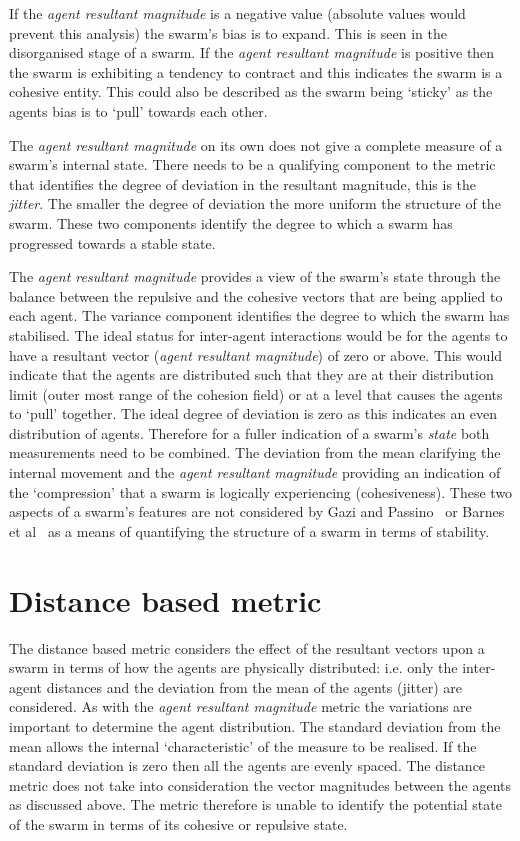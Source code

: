 If the \textit{agent resultant magnitude} is a negative value (absolute values would prevent this analysis) the swarm's bias is to expand. This is seen in the disorganised stage of a swarm. If the \textit{agent resultant magnitude} is positive then the swarm is exhibiting a tendency to contract and this indicates the swarm is a cohesive entity. This could also be described as the swarm being `sticky' as the agents bias is to `pull' towards each other.

The \textit{agent resultant magnitude} on its own does not give a complete measure of a swarm's internal state. There needs to be a qualifying component to the metric  that identifies the degree of deviation in the resultant magnitude, this is the \textit{jitter}. The smaller the degree of deviation the more uniform the structure of the swarm. These two components identify the degree to which a swarm has progressed towards a stable state. 

The \textit{agent resultant magnitude} provides a view of the swarm's state through the balance between the repulsive and the cohesive vectors that are being applied to each agent. The variance component identifies the degree to which the swarm has stabilised. The ideal status for inter-agent interactions would be for the agents to have a resultant vector (\textit{agent resultant magnitude}) of zero or above. This would indicate that the agents are distributed such that they are at their distribution limit (outer most range of the cohesion field) or at a level that causes the agents to `pull' together. The ideal degree of deviation is zero as this indicates an even distribution of agents. Therefore for a fuller indication of a swarm's \textit{state} both measurements need to be combined. The deviation from the mean clarifying the internal movement and the \textit{agent resultant magnitude} providing an indication of the `compression' that a swarm is logically experiencing (cohesiveness). These two aspects of a swarm's features are not considered by Gazi and Passino~\cite{GP:11} or Barnes et al~\cite{BFV:07} as a means of quantifying the structure of a swarm in terms of stability.

\section{Distance based metric\label{section:DistanceDynamics}}
The distance based metric considers the effect of the resultant vectors upon a swarm in terms of how the agents are physically distributed: i.e. only the inter-agent distances and the deviation from the mean of the agents (jitter) are considered. As with the \textit{agent resultant magnitude} metric the variations are important to determine the agent distribution. The standard deviation from the mean allows the internal `characteristic' of the measure to be realised. If the standard deviation is zero then all the agents are evenly spaced. The distance metric does not take into consideration the vector magnitudes between the agents as discussed above. The metric therefore is unable to identify the potential state of the swarm in terms of its cohesive or repulsive state.

